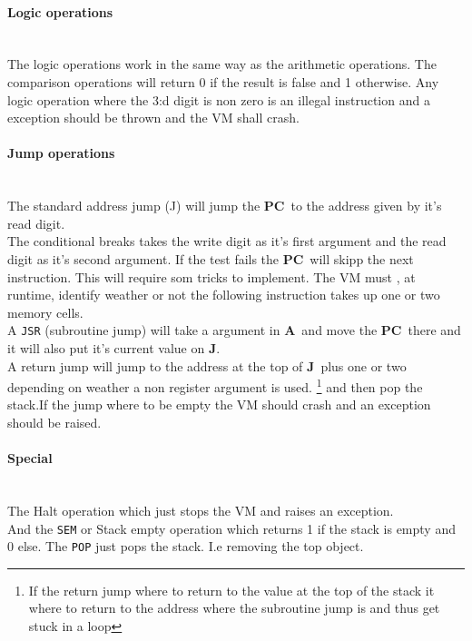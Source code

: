 \documentclass{article}
\newcommand{\V}{\verb}
\newcommand{\A}{$\textbf{A}$}
\newcommand{\pc}{$\textbf{PC}$}
\newcommand{\J}{$\textbf{J}$}
\begin{document}
\paragraph{Logic operations} \
\\
The logic operations work in the same way as the arithmetic operations. The
comparison operations will return 0 if the result is false and 1 otherwise.
Any logic operation where the 3:d digit is non zero is an illegal instruction
and a exception should be thrown and the VM shall crash.

\paragraph{Jump operations} \
\\
The standard address jump (J) will jump the \pc \ to the address given by it's
read digit.\\
The conditional breaks takes the write digit as it's first argument and the read
digit as it's second argument. If the test fails the \pc \ will skipp the next
instruction. This will require som tricks to implement. The VM must , at
runtime, identify weather or not the following instruction takes up one or two
memory cells.\\

A \V+JSR+ (subroutine jump) will take a argument in \A \ and move the \pc \
there and it will also put it's current value on \J.\\
A return jump will jump to the address at the top of \J \ plus one or two
depending on weather a non register argument is used.
 \footnote{If the return jump where to return to the value at the top of the
 stack it where to return to the address where the subroutine jump is and thus 
 get stuck in a loop} and then pop the stack.If the jump where to be empty the 
 VM should crash and an exception should be raised.\\


\paragraph{Special}\
\\
The Halt operation which just stops the VM and
raises an exception.\\
And the \V+SEM+ or Stack empty operation which returns 1 if the stack is empty
and 0 else.
The \V+POP+ just pops the stack. I.e removing the top object.
\end{document}
